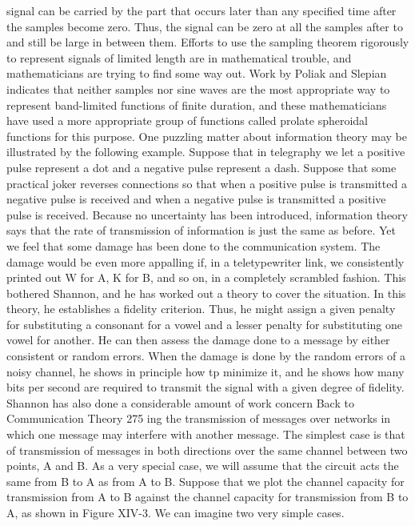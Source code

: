 {{{{{{{{{{{{signal can be carried by the part that occurs later than any specified
time after the samples become zero. Thus, the signal can be zero
at all the samples after to and still be large in between them.
Efforts to use the sampling theorem rigorously to represent
signals of limited length are in mathematical trouble, and mathematicians
are trying to find some way out.
Work by Poliak and Slepian indicates that neither samples nor
sine waves are the most appropriate way to represent band-limited
functions of finite duration, and these mathematicians have used
a more appropriate group of functions called prolate spheroidal
functions for this purpose.
One puzzling matter about information theory may be illustrated
by the following example. Suppose that in telegraphy we let a
positive pulse represent a dot and a negative pulse represent a dash.
Suppose that some practical joker reverses connections so that
when a positive pulse is transmitted a negative pulse is received
and when a negative pulse is transmitted a positive pulse is
received. Because no uncertainty has been introduced, information
theory says that the rate of transmission of information is just the
same as before. Yet we feel that some damage has been done to
the communication system. The damage would be even more
appalling if, in a teletypewriter link, we consistently printed out
W for A, K for B, and so on, in a completely scrambled fashion.
This bothered Shannon, and he has worked out a theory to
cover the situation. In this theory, he establishes a fidelity criterion.
Thus, he might assign a given penalty for substituting a consonant
for a vowel and a lesser penalty for substituting one vowel for
another. He can then assess the damage done to a message by either
consistent or random errors. When the damage is done by the
random errors of a noisy channel, he shows in principle how tp
minimize it, and he shows how many bits per second are required
to transmit the signal with a given degree of fidelity.
Shannon has also done a considerable amount of work concern
Back to Communication Theory
275
ing the transmission of messages over networks in which one message
may interfere with another message. The simplest case is that
of transmission of messages in both directions over the same
channel between two points, A and B. As a very special case, we
will assume that the circuit acts the same from B to A as from
A to B.
Suppose that we plot the channel capacity for transmission from
A to B against the channel capacity for transmission from B to A,
as shown in Figure XIV-3. We can imagine two very simple cases.
}}}}}}}}}}}}
